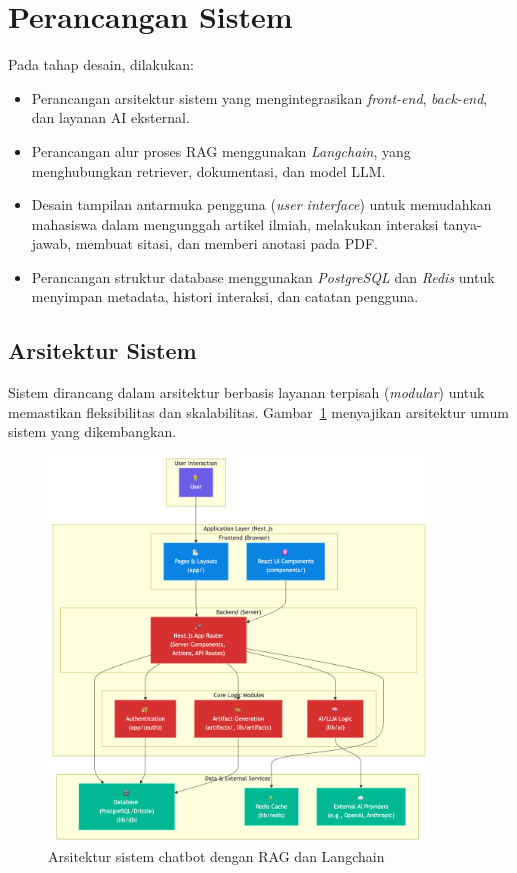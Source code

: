 \section{Perancangan Sistem}
Pada tahap desain, dilakukan:
\begin{itemize}
  \item Perancangan arsitektur sistem yang mengintegrasikan \textit{front-end}, \textit{back-end}, dan layanan AI eksternal.
  \item Perancangan alur proses RAG menggunakan \textit{Langchain}, yang menghubungkan retriever, dokumentasi, dan model LLM.
  \item Desain tampilan antarmuka pengguna (\textit{user interface}) untuk memudahkan mahasiswa dalam mengunggah artikel ilmiah, melakukan interaksi tanya-jawab, membuat sitasi, dan memberi anotasi pada PDF.\@
  \item Perancangan struktur database menggunakan \textit{PostgreSQL} dan \textit{Redis} untuk menyimpan metadata, histori interaksi, dan catatan pengguna.
\end{itemize}

\subsection{Arsitektur Sistem}
Sistem dirancang dalam arsitektur berbasis layanan terpisah (\textit{modular}) untuk memastikan fleksibilitas dan skalabilitas. Gambar~\ref{fig:arsitektur-sistem} menyajikan arsitektur umum sistem yang dikembangkan.

\begin{figure}[H]
  \centering
  \includegraphics[width=0.9\textwidth]{images/system-arch.png}
  \caption{Arsitektur sistem chatbot dengan RAG dan Langchain}\label{fig:arsitektur-sistem}
\end{figure}

